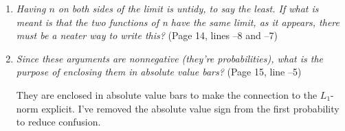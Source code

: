 \documentclass[12pt]{article}
\begin{document}
\begin{enumerate}
\item \emph{Having $n$ on both sides of the limit is untidy, to say
    the least. If what is meant is that the two functions of n have
    the same limit, as it appears, there must be a neater way to write
    this?} (Page 14, lines --8 and --7)

\item \emph{Since these arguments are nonnegative (they're
    probabilities), what is the purpose of enclosing them in absolute
    value bars?} (Page 15, line --5)

  They are enclosed in absolute value bars to make the connection to the
  $L_{1}$-norm explicit. I've removed the absolute value sign from the first
  probability to reduce confusion.

\end{enumerate}
\end{document}
